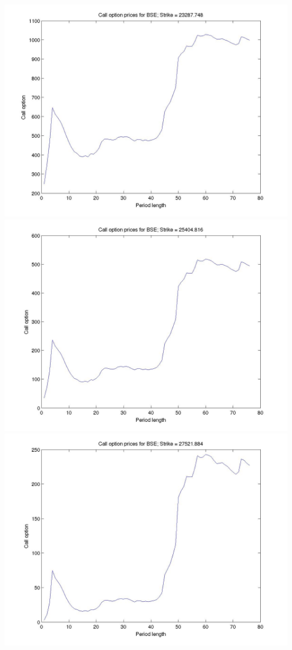 \documentclass[12pt]{article}
\begin{document}
\begin{center}
      \includegraphics[width=5in]{put_strike7.jpg}
      \includegraphics[width=5in]{put_strike8.jpg}
      \includegraphics[width=5in]{put_strike9.jpg}

\end{center}
\end{document}
